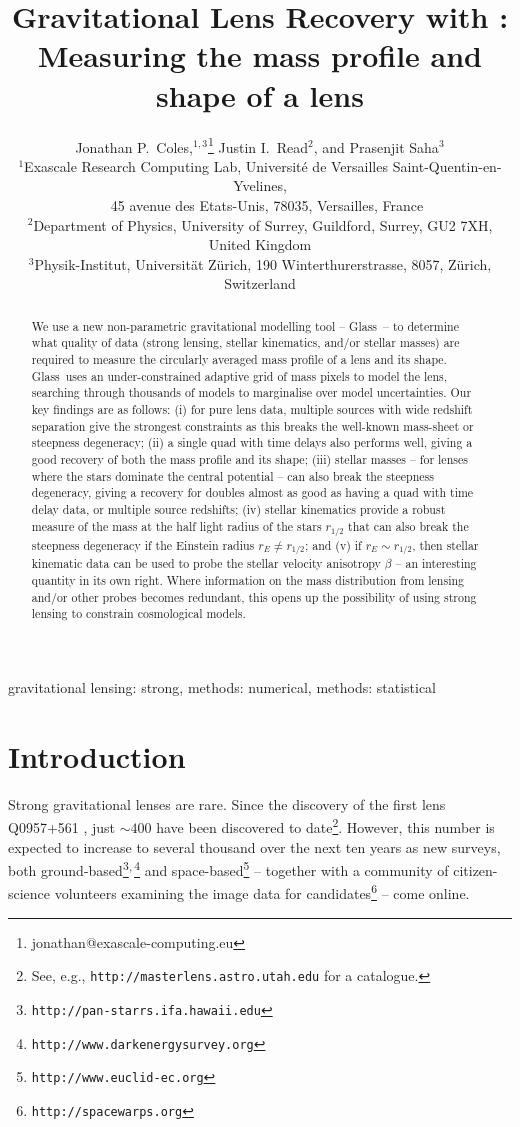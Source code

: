 \documentclass[galley,usenatbib]{mn2e}
\title[Lens Recovery with \Glass]{Gravitational Lens Recovery with \Glass: Measuring the mass profile and shape of a lens}
\author[J.~P.~Coles~et~al.]{%
Jonathan P.~Coles,$^{1,3}$\thanks{jonathan@exascale-computing.eu}%
\newauthor%
Justin I.~Read$^2$,%
\newauthor%
and Prasenjit Saha$^3$%
%
\\
$^1$Exascale Research Computing Lab, Universit\'e de Versailles Saint-Quentin-en-Yvelines,\\$\quad$45 avenue des Etats-Unis, 78035, Versailles, France\\
$^2$Department of Physics, University of Surrey, Guildford, Surrey, GU2 7XH, United Kingdom \\
$^3$Physik-Institut, Universit\"at Z\"urich, 190 Winterthurerstrasse, 8057, Z\"urich, Switzerland
}
\newcommand{\Glass}{{\sc Glass}}
\newcommand{\url}[1]{\tt #1}
\begin{document}
\maketitle

\begin{abstract}
We use a new non-parametric gravitational modelling tool -- \Glass\ -- to
determine what quality of data (strong lensing, stellar kinematics, and/or
stellar masses) are required to measure the circularly averaged mass profile of
a lens and its shape. \Glass\ uses an under-constrained adaptive grid of mass
pixels to model the lens, searching through thousands of models to marginalise
over model uncertainties. Our key findings are as follows: (i) for pure lens
data, multiple sources with wide redshift separation give the strongest
constraints as this breaks the well-known mass-sheet or steepness degeneracy;
(ii) a single quad with time delays also performs well, giving a good recovery
of both the mass profile and its shape; (iii) stellar masses -- for lenses
where the stars dominate the central potential -- can also break the steepness
degeneracy, giving a recovery for doubles almost as good as having a quad with time delay data, or
multiple source redshifts; (iv) stellar kinematics provide a robust measure of
the mass at the half light radius of the stars $r_{1/2}$ that can also break
the steepness degeneracy if the Einstein radius $r_E \neq r_{1/2}$; and (v)
if $r_E \sim r_{1/2}$, then stellar kinematic data can be used to probe the
stellar velocity anisotropy $\beta$ -- an interesting quantity in its own
right. Where information on the mass distribution from lensing and/or other
probes becomes redundant, this opens up the possibility of using strong lensing
to constrain cosmological models. 
\end{abstract}

\begin{keywords}
gravitational lensing: strong, methods: numerical, methods: statistical
\end{keywords}

\section{Introduction}\label{sec:intro}

Strong gravitational lenses are rare. Since the discovery of the first lens
Q0957+561 \citep{1979Natur.279..381W}, just $\sim400$ have been discovered to
date\footnote{See, e.g., {\url{http://masterlens.astro.utah.edu}} for a catalogue.}.
However, this number is expected to increase to several thousand over the next
ten years as new surveys, both
ground-based\footnote{\url{http://pan-starrs.ifa.hawaii.edu}}$^{\rm,}$\footnote{\url{http://www.darkenergysurvey.org}}
and space-based\footnote{\url{http://www.euclid-ec.org}} -- together with a community
of citizen-science volunteers examining the image data for
candidates\footnote{\url{http://spacewarps.org}} -- come online. 
\end{document}
